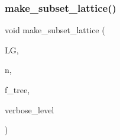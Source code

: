\mbox{\label{poset__of__subsets_8_c_a1461006fc0ae155dcbb22a4ad0ae712e}} 
\subsubsection{\texorpdfstring{make\+\_\+subset\+\_\+lattice()}{make\_subset\_lattice()}}
{\footnotesize\ttfamily void make\+\_\+subset\+\_\+lattice (\begin{DoxyParamCaption}\item[{\mbox{\hyperlink{classlayered__graph}{layered\+\_\+graph}} $\ast$\&}]{LG,  }\item[{\mbox{\hyperlink{galois_8h_a09fddde158a3a20bd2dcadb609de11dc}{I\+NT}}}]{n,  }\item[{\mbox{\hyperlink{galois_8h_a09fddde158a3a20bd2dcadb609de11dc}{I\+NT}}}]{f\+\_\+tree,  }\item[{\mbox{\hyperlink{galois_8h_a09fddde158a3a20bd2dcadb609de11dc}{I\+NT}}}]{verbose\+\_\+level }\end{DoxyParamCaption})}

